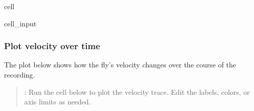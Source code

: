 \documentclass[letterpaper,10pt,english]{jupyterBook}
\begin{document}
\begin{sphinxuseclass}{cell}
\begin{sphinxVerbatimInput}
\begin{sphinxuseclass}{cell_input}
\begin{sphinxVerbatim}[commandchars=\\\{\}]
 
 
 

     

\end{sphinxVerbatim}

\end{sphinxuseclass}\end{sphinxVerbatimInput}

\end{sphinxuseclass}

\subsubsection{Plot velocity over time}
\label{\detokenize{FlyTracking/Script:plot-velocity-over-time}}
\sphinxAtStartPar
The plot below shows how the fly’s velocity changes over the course of the recording.
\begin{quote}

\sphinxAtStartPar
{}: Run the cell below to plot the velocity trace. Edit the labels, colors, or axis limits as needed.
\end{quote}
\end{document}
